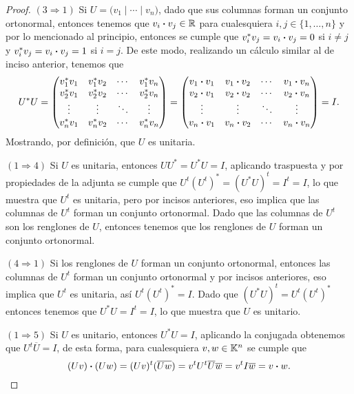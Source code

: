 \begin{proof}
  \medskip\noindent
  $(3 \Rightarrow 1)$ Si $U = \bigl( v_1 \mid \cdots \mid v_n \bigr)$, dado que sus columnas forman un conjunto ortonormal, entonces tenemos que $v_i \boldsymbol\cdot v_j \in \mathbb{R}$ para cualesquiera $i,j \in \{1,\ldots,n\}$ y por lo mencionado al principio, entonces se cumple que $ v_i^* v_j = v_i \boldsymbol\cdot v_j  = 0$ si $i \neq j$ y $v_i^* v_j = v_i \boldsymbol\cdot v_j  =  1$ si $i = j$. De este modo, realizando un cálculo similar al de inciso anterior, tenemos que
  \[
    U^* U =
      \begin{pmatrix}
        v_1^* v_1 & v_1^* v_2 & \cdots & v_1^* v_n \\
        v_2^* v_1 & v_2^* v_2 & \cdots & v_2^* v_n \\
        \vdots & \vdots & \ddots & \vdots \\
        v_n^* v_1 & v_n^* v_2 & \cdots & v_n^* v_n 
      \end{pmatrix}  =
      \begin{pmatrix}
        v_1 \boldsymbol\cdot v_1 & v_1 \boldsymbol\cdot v_2 & \cdots & v_1 \boldsymbol\cdot v_n \\
        v_2 \boldsymbol\cdot v_1 & v_2 \boldsymbol\cdot v_2 & \cdots & v_2 \boldsymbol\cdot v_n \\
        \vdots & \vdots & \ddots & \vdots \\
        v_n \boldsymbol\cdot v_1 & v_n \boldsymbol\cdot v_2 & \cdots & v_n \boldsymbol\cdot v_n 
      \end{pmatrix} 
    = I.
  \]
  Mostrando, por definición, que $U$ es unitaria.

  \medskip\noindent
  $(1 \Rightarrow 4)$ Si $U$ es unitaria, entonces $UU^* = U^* U = I$, aplicando traspuesta y por propiedades de la adjunta se cumple que $U^t (U^t)^* = (U^* U)^t  = I^t = I$, lo que muestra que $U^t$ es unitaria, pero por incisos anteriores, eso implica que las columnas de $U^t$ forman un conjunto ortonormal. Dado que las columnas de $U^t$ son los renglones de $U$, entonces tenemos que los renglones de $U$ forman un conjunto ortonormal.

  \medskip\noindent
  $(4 \Rightarrow 1)$ Si los renglones de $U$ forman un conjunto ortonormal, entonces las columnas de $U^t$ forman un conjunto ortonormal y por incisos anteriores, eso implica que $U^t$ es unitaria, así $U^t (U^t)^* = I$. Dado que $(U^* U)^t = U^t (U^t)^* $ entonces tenemos que $U^* U = I^t = I$, lo que muestra que $U$ es unitario.

  \medskip\noindent
  $(1 \Rightarrow 5)$ Si $U$ es unitario, entonces $U^* U = I$, aplicando la conjugada obtenemos que $U^t \overline{U} = I$, de esta forma, para cualesquiera $v,w \in \mathbb{K}^n$ se cumple que 
      \[
        (Uv) \boldsymbol\cdot (Uw) = (Uv)^t (\overline{Uw}) = v^t U^t \overline{U}\overline{w} = v^t I \overline{w} = v\boldsymbol\cdot w.
      \]
  

\end{proof}
